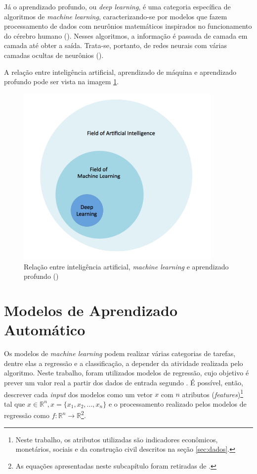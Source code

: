 Já o aprendizado profundo, ou \textit{deep learning}, é uma 
categoria específica de algoritmos de \textit{machine learning}, caracterizando-se por 
modelos que fazem processamento de dados com neurônios 
matemáticos inspirados no 
funcionamento do cérebro humano (\cite{deeplearningbook}). Nesses algoritmos, a informação
é passada de camada em camada até obter a saída. Trata-se, portanto,
de redes neurais com várias camadas ocultas de neurônios (\cite{d2l}). 

A relação entre inteligência artificial, aprendizado de 
máquina e aprendizado profundo pode ser vista na 
imagem \ref{fig:ia_ml}.

\begin{figure}[H] 
  \includegraphics[width= 10cm]{../figuras/ia_ml.png}
  \caption{Relação entre inteligência artificial, \textit{machine learning} e aprendizado profundo (\cite{dl-oreilly})}
  \label{fig:ia_ml}
\end{figure}

\section{Modelos de Aprendizado Automático}
 
Os modelos de \textit{machine learning} podem realizar várias categorias 
de tarefas, dentre elas a regressão e a classificação, a 
depender da atividade realizada pelo algoritmo.
Neste trabalho,  foram utilizados modelos de regressão, cujo objetivo é prever um valor real a 
partir dos dados de entrada segundo \citet{Goodfellow-et-al-2016}.
É possível, então, descrever cada \textit{input} dos modelos como um vetor $x$ com 
$n$ atributos (\textit{features})\footnote{Neste trabalho, 
os atributos utilizadas são indicadores econômicos, monetários,
sociais e da construção civil descritos na seção \ref{sec:dados}.} tal que
$x \in \mathbb{R}^n , x=\{x_1, x_2, ..., x_n\}$ e o 
processamento realizado pelos modelos de regressão como $ f : \mathbb{R}^n \rightarrow \mathbb{R}$\footnote{As equações apresentadas neste subcapítulo foram retiradas de \cite{Goodfellow-et-al-2016}.}. 

